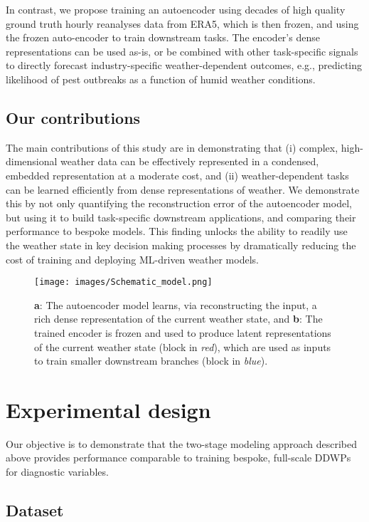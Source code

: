 \documentclass{article}
\begin{document}
In contrast, we propose training an autoencoder using decades of high quality ground truth hourly reanalyses data from ERA5, which is then frozen, and using the frozen auto-encoder to train downstream tasks. The encoder's dense representations can be used as-is, or be combined with other task-specific signals to directly forecast industry-specific weather-dependent outcomes, e.g., predicting likelihood of pest outbreaks as a function of humid weather conditions.

\subsection{Our contributions}

The main contributions of this study are in demonstrating that (i) complex, high-dimensional weather data can be effectively represented in a condensed, embedded representation at a moderate cost, and (ii) weather-dependent tasks can be learned efficiently from dense representations of weather. We demonstrate this by not only quantifying the reconstruction error of the autoencoder model, but using it to build task-specific downstream applications, and comparing their performance to bespoke models. This finding unlocks the ability to readily use the weather state in key decision making processes by dramatically reducing the cost of training and deploying ML-driven weather models.

\begin{figure}[ht]
    \centering
    \texttt{[image: images/Schematic\_model.png]}
    \caption{\textbf{a}: The autoencoder model learns, via reconstructing the input, a rich dense representation of the current weather state, and \textbf{b}: The trained encoder is frozen and used to produce latent representations of the current weather state (block in \textit{red}), which are used as inputs to train smaller downstream branches (block in \textit{blue}).}
    \label{fig:schematic-label}
\end{figure}

\section{Experimental design}
Our objective is to demonstrate that the two-stage modeling approach described above provides performance comparable to training bespoke, full-scale DDWPs for diagnostic variables.

\subsection{Dataset}
\end{document}
